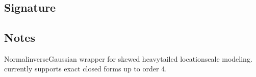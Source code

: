 \documentclass[letterpaper,10pt,english]{sphinxmanual}
\begin{document}
\section{}
\label{\detokenize{object_api_reference:nig}}

\subsection{Signature}
\label{\detokenize{object_api_reference:id61}}
\begin{sphinxVerbatim}[commandchars=\\\{\}]

\end{sphinxVerbatim}


\subsection{Notes}
\label{\detokenize{object_api_reference:id62}}
\sphinxAtStartPar
Normal\sphinxhyphen{}inverse\sphinxhyphen{}Gaussian wrapper for skewed heavy\sphinxhyphen{}tailed location\sphinxhyphen{}scale modeling.  currently supports exact closed forms up to order 4.
\end{document}
